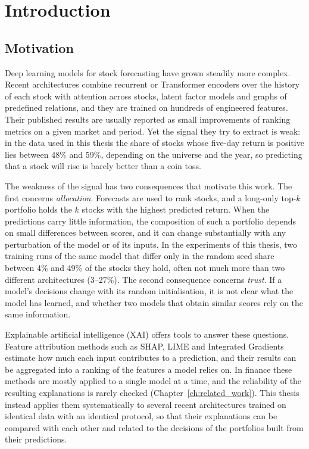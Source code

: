 
\chapter{Introduction}
\label{ch:introduction}

\section{Motivation}
\label{sec:intro_motivation}

Deep learning models for stock forecasting have grown steadily more complex. Recent architectures combine recurrent or Transformer encoders over the history of each stock with attention across stocks, latent factor models and graphs of predefined relations, and they are trained on hundreds of engineered features. Their published results are usually reported as small improvements of ranking metrics on a given market and period. Yet the signal they try to extract is weak: in the data used in this thesis the share of stocks whose five-day return is positive lies between 48\% and 59\%, depending on the universe and the year, so predicting that a stock will rise is barely better than a coin toss.

The weakness of the signal has two consequences that motivate this work. The first concerns \emph{allocation}. Forecasts are used to rank stocks, and a long-only top-$k$ portfolio holds the $k$ stocks with the highest predicted return. When the predictions carry little information, the composition of such a portfolio depends on small differences between scores, and it can change substantially with any perturbation of the model or of its inputs. In the experiments of this thesis, two training runs of the same model that differ only in the random seed share between 4\% and 49\% of the stocks they hold, often not much more than two different architectures (3--27\%). The second consequence concerns \emph{trust}. If a model's decisions change with its random initialisation, it is not clear what the model has learned, and whether two models that obtain similar scores rely on the same information.

Explainable artificial intelligence (XAI) offers tools to answer these questions. Feature attribution methods such as SHAP, LIME and Integrated Gradients estimate how much each input contributes to a prediction, and their results can be aggregated into a ranking of the features a model relies on. In finance these methods are mostly applied to a single model at a time, and the reliability of the resulting explanations is rarely checked (Chapter~\ref{ch:related_work}). This thesis instead applies them systematically to several recent architectures trained on identical data with an identical protocol, so that their explanations can be compared with each other and related to the decisions of the portfolios built from their predictions.

